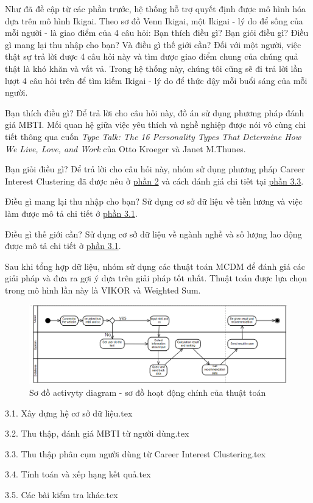 Như đã đề cập từ các phần trước, hệ thống hỗ trợ quyết định được mô hình hóa dựa trên mô hình Ikigai. Theo sơ đồ Venn Ikigai, một Ikigai - lý do để sống của mỗi người - là giao điểm của 4 câu hỏi: Bạn thích điều gì? Bạn giỏi điều gì? Điều gì mang lại thu nhập cho bạn? Và điều gì thế giới cần? Đối với một người, việc thật sự trả lời được 4 câu hỏi này và tìm được giao điểm chung của chúng quả thật là khó khăn và vất vả. Trong hệ thống này, chúng tôi cũng sẽ đi trả lời lần lượt 4 câu hỏi trên để tìm kiếm Ikigai - lý do để thức dậy mỗi buổi sáng của mỗi người.

Bạn thích điều gì? Để trả lời cho câu hỏi này, đồ án sử dụng phương pháp đánh giá MBTI. Mối quan hệ giữa việc yêu thích và nghề nghiệp được nói vô cùng chi tiết thông qua cuốn \textit{Type Talk: The 16 Personality Types That Determine How We Live, Love, and Work} của Otto Kroeger và Janet M.Thunes.

Bạn giỏi điều gì? Để trả lời cho câu hỏi này, nhóm sử dụng phương pháp Career Interest Clustering đã được nêu ở \hyperref[2]{phần 2} và cách đánh giá chi tiết tại \hyperref[3.3]{phần 3.3}.

Điều gì mang lại thu nhập cho bạn? Sử dụng cơ sở dữ liệu về tiền lương và việc làm được mô tả chi tiết ở \hyperref[3.1]{phần 3.1}.

Điều gì thế giới cần? Sử dụng cơ sở dữ liệu về ngành nghề và số lượng lao động được mô tả chi tiết ở \hyperref[3.1]{phần 3.1}.

Sau khi tổng hợp dữ liệu, nhóm sử dụng các thuật toán MCDM để đánh giá các giải pháp và đưa ra gợi ý dựa trên giải pháp tốt nhất. Thuật toán được lựa chọn trong mô hình lần này là VIKOR và Weighted Sum.

\begin{figure}[H]
    \centering
    \includegraphics[width=0.8\linewidth]{images/chap3/activity.png}
    \vspace{0.5cm}
    \caption{Sơ đồ activyty diagram - sơ đồ hoạt động chính của thuật toán}
\end{figure}

{3.1. Xây dựng hệ cơ sở dữ liệu.tex}

{3.2. Thu thập, đánh giá MBTI từ người dùng.tex}

{3.3. Thu thập phân cụm người dùng từ Career Interest Clustering.tex}

{3.4. Tính toán và xếp hạng kết quả.tex}

{3.5. Các bài kiểm tra khác.tex}